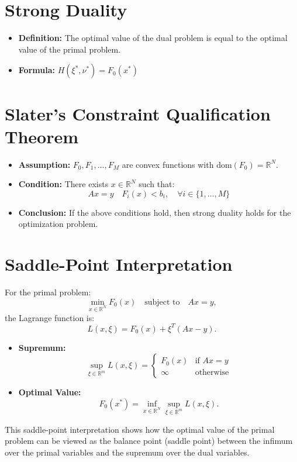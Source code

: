 \documentclass{article}
\begin{document}
\section*{Strong Duality}
\begin{itemize}
    \item \textbf{Definition:} The optimal value of the dual problem is equal to the optimal value of the primal problem.
    \item \textbf{Formula:} \( H(\xi^{*}, \nu^{*}) = F_{0}(x^{*}) \)
\end{itemize}

\section*{Slater's Constraint Qualification Theorem}
\begin{itemize}
    \item \textbf{Assumption:} \( F_{0}, F_{1}, \ldots, F_{M} \) are convex functions with \( \text{dom}(F_{0}) = \mathbb{R}^{N} \).
    \item \textbf{Condition:} There exists \( x \in \mathbb{R}^{N} \) such that:
    \[
    Ax = y \quad F_{i}(x) < b_{i}, \quad \forall i \in \{1, \ldots, M\}
    \]
    \item \textbf{Conclusion:} If the above conditions hold, then strong duality holds for the optimization problem.
\end{itemize}

\section*{Saddle-Point Interpretation}
For the primal problem:
\[
\min_{x \in \mathbb{R}^{N}} F_{0}(x) \quad \text{subject to} \quad Ax = y,
\]
the Lagrange function is:
\[
L(x, \xi) = F_{0}(x) + \xi^{T}(Ax - y).
\]
\begin{itemize}
    \item \textbf{Supremum:}
    \[
    \sup_{\xi \in \mathbb{R}^{m}} L(x, \xi) = 
    \begin{cases} 
        F_{0}(x) & \text{if } Ax = y \\ 
        \infty & \text{otherwise} 
    \end{cases}
    \]
    \item \textbf{Optimal Value:}
    \[
    F_{0}(x^{*}) = \inf_{x \in \mathbb{R}^{N}} \sup_{\xi \in \mathbb{R}^{m}} L(x, \xi).
    \]
\end{itemize}
This saddle-point interpretation shows how the optimal value of the primal problem can be viewed as the balance point (saddle point) between the infimum over the primal variables and the supremum over the dual variables.
\end{document}
